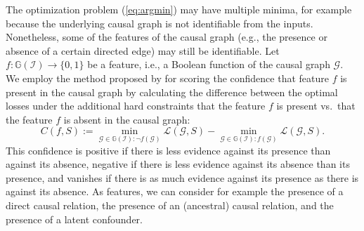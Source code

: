 \documentclass[twoside,11pt]{article}
\DeclareMathOperator*{\SEP}{\perp}
\newcommand\C[1]{\mathcal{#1}}
\newcommand\given{\,|\,}
\newcommand{\I}{\mathbbm{1}}
\begin{document}
The optimization problem (\ref{eq:argmin}) may have multiple minima, for example because the underlying causal graph is not identifiable from the inputs. Nonetheless, some of the features of the causal graph (e.g., the presence or absence of a certain
directed edge) may still be identifiable. 
Let $f : \mathbb{G}(\C{I}) \to \{0,1\}$ be a feature, i.e., a Boolean function of the causal graph $\C{G}$.
We employ the method proposed by \cite{MagliacaneClaassenMooij_NIPS_16} for scoring
the confidence that feature $f$ is present in the causal graph by calculating the difference between the optimal losses under the 
additional hard constraints that the feature $f$ is present vs.\ that the feature $f$ is absent in the causal graph:
\begin{equation}\label{eq:confidence_feature}
  C(f,S) := \min_{\C{G} \in \mathbb{G}(\C{I}): \lnot f(\C{G})} \mathcal{L}(\C{G},S) - \min_{\C{G} \in \mathbb{G}(\C{I}): f(\C{G})} \mathcal{L}(\C{G},S).
\end{equation}
This confidence is positive if there is less evidence against its presence than against its absence, negative if there is less evidence against its absence than its presence, and vanishes if there is as much evidence against its presence as there is against its absence.
As features, we can consider for example the presence of a direct causal relation, the presence of
an (ancestral) causal relation, and the presence of a latent confounder.
\end{document}
